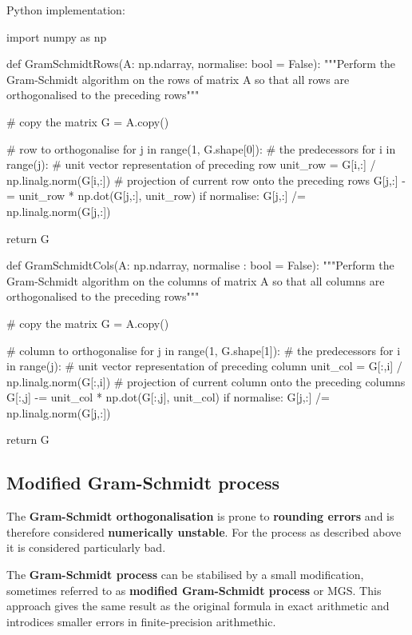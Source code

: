 Python implementation:

\begin{python}
import numpy as np

def GramSchmidtRows(A: np.ndarray, normalise: bool = False):
    """Perform the Gram-Schmidt algorithm on the rows of matrix A so that all
    rows are orthogonalised to the preceding rows"""

    # copy the matrix
    G = A.copy()

    # row to orthogonalise
    for j in range(1, G.shape[0]):
        # the predecessors
        for i in range(j):
            # unit vector representation of preceding row
            unit_row = G[i,:] / np.linalg.norm(G[i,:])
            # projection of current row onto the preceding rows
            G[j,:] -= unit_row * np.dot(G[j,:], unit_row)
        if normalise:
            G[j,:] /= np.linalg.norm(G[j,:])

    return G

def GramSchmidtCols(A: np.ndarray, normalise : bool = False):
    """Perform the Gram-Schmidt algorithm on the columns of matrix A so that all
    columns are orthogonalised to the preceding rows"""

    # copy the matrix
    G = A.copy()

    # column to orthogonalise
    for j in range(1, G.shape[1]):
        # the predecessors
        for i in range(j):
            # unit vector representation of preceding column
            unit_col = G[:,i] / np.linalg.norm(G[:,i])
            # projection of current column onto the preceding columns
            G[:,j] -= unit_col * np.dot(G[:,j], unit_col)
        if normalise:
            G[j,:] /= np.linalg.norm(G[j,:])

    return G
\end{python}


\subsection{Modified Gram-Schmidt process}

The \textbf{Gram-Schmidt orthogonalisation} is prone to \textbf{rounding errors} and
is therefore considered \textbf{numerically unstable}. For the process as described
above it is considered particularly bad.

The \textbf{Gram-Schmidt process} can be stabilised by a small modification, sometimes
referred to as \textbf{modified Gram-Schmidt process} or MGS. This approach
gives the same result as the original formula in exact arithmetic and introdices
smaller errors in finite-precision arithmethic.

